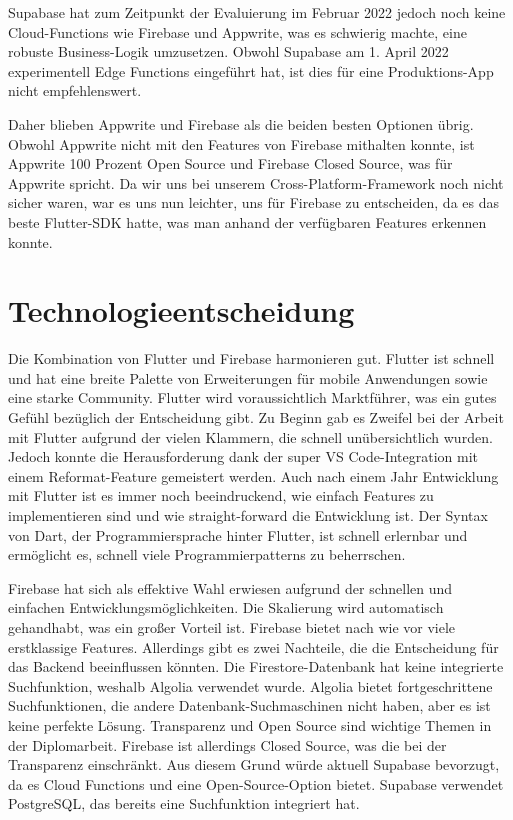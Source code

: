 Supabase hat zum Zeitpunkt der Evaluierung im Februar 2022 jedoch noch keine Cloud-Functions wie Firebase und Appwrite, was es schwierig machte, eine robuste Business-Logik umzusetzen. Obwohl Supabase am 1. April 2022 experimentell Edge Functions eingeführt hat, ist dies für eine Produktions-App nicht empfehlenswert.

Daher blieben Appwrite und Firebase als die beiden besten Optionen übrig. Obwohl Appwrite nicht mit den Features von Firebase mithalten konnte, ist Appwrite 100 Prozent Open Source und Firebase Closed Source, was für Appwrite spricht. Da wir uns bei unserem Cross-Platform-Framework noch nicht sicher waren, war es uns nun leichter, uns für Firebase zu entscheiden, da es das beste Flutter-SDK hatte, was man anhand der verfügbaren Features erkennen konnte.

\section{Technologieentscheidung}
Die Kombination von Flutter und Firebase harmonieren gut. Flutter ist schnell und hat eine breite Palette von Erweiterungen für mobile Anwendungen sowie eine starke Community. Flutter wird voraussichtlich Marktführer, was ein gutes Gefühl bezüglich der Entscheidung gibt. Zu Beginn gab es Zweifel bei der Arbeit mit Flutter aufgrund der vielen Klammern, die schnell unübersichtlich wurden. Jedoch konnte die Herausforderung dank der super VS Code-Integration mit einem Reformat-Feature gemeistert werden. Auch nach einem Jahr Entwicklung mit Flutter ist es immer noch beeindruckend, wie einfach Features zu implementieren sind und wie straight-forward die Entwicklung ist. Der Syntax von Dart, der Programmiersprache hinter Flutter, ist schnell erlernbar und ermöglicht es, schnell viele Programmierpatterns zu beherrschen.

Firebase hat sich als effektive Wahl erwiesen aufgrund der schnellen und einfachen Entwicklungsmöglichkeiten. Die Skalierung wird automatisch gehandhabt, was ein großer Vorteil ist. Firebase bietet nach wie vor viele erstklassige Features. Allerdings gibt es zwei Nachteile, die die Entscheidung für das Backend beeinflussen könnten. Die Firestore-Datenbank hat keine integrierte Suchfunktion, weshalb Algolia verwendet wurde. Algolia bietet fortgeschrittene Suchfunktionen, die andere Datenbank-Suchmaschinen nicht haben, aber es ist keine perfekte Lösung. Transparenz und Open Source sind wichtige Themen in der Diplomarbeit. Firebase ist allerdings Closed Source, was die bei der Transparenz einschränkt. Aus diesem Grund würde aktuell Supabase bevorzugt, da es Cloud Functions und eine Open-Source-Option bietet. Supabase verwendet PostgreSQL, das bereits eine Suchfunktion integriert hat.
